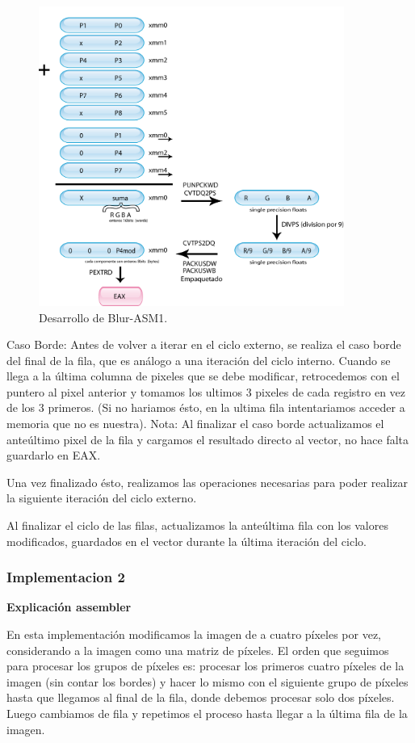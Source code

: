 \begin{figure}[ht!]
\centering
\includegraphics[width=100mm]{imagenes/blur/blur1-figura3.png}
\caption{Desarrollo de Blur-ASM1.}
\end{figure}

Caso Borde: Antes de volver a iterar en el ciclo externo, se realiza el caso borde del final de la fila, que es análogo a una iteración del ciclo interno. Cuando se llega a la última columna de pixeles que se debe modificar, retrocedemos con el puntero al pixel anterior y tomamos los ultimos 3 pixeles de cada registro en vez de los 3 primeros. (Si no hariamos ésto, en la ultima fila intentariamos acceder a memoria que no es nuestra).
Nota: Al finalizar el caso borde actualizamos el anteúltimo pixel de la fila y cargamos el resultado directo al vector, no hace falta guardarlo en EAX.

Una vez finalizado ésto, realizamos las operaciones necesarias para poder realizar la siguiente iteración del ciclo externo.

Al finalizar el ciclo de las filas, actualizamos la anteúltima fila con los valores modificados, guardados en el vector durante la última iteración del ciclo.


\subsubsection{Implementacion 2}

\textbf{Explicación assembler}

En esta implementación modificamos la imagen de a cuatro píxeles por vez, considerando a la imagen como una matriz de píxeles. El orden que seguimos para procesar los grupos de píxeles es: procesar los primeros cuatro píxeles de la imagen (sin contar los bordes) y hacer lo mismo con el siguiente grupo de píxeles hasta que llegamos al final de la fila, donde debemos procesar solo dos píxeles. Luego cambiamos de fila y repetimos el proceso hasta llegar a la última fila de la imagen.

